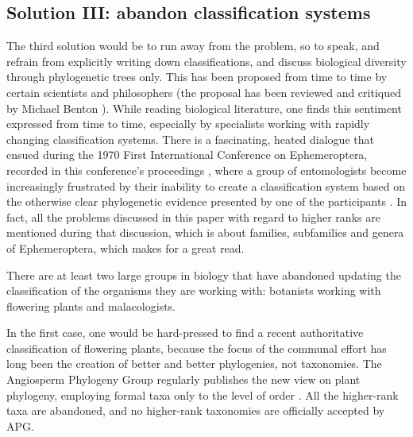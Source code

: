 \begin{artengenv}
\subsection{Solution III: abandon classification systems}

The third solution would be to run away from the problem, so to speak, and refrain from explicitly writing down
classifications, and discuss biological diversity through phylogenetic trees only. This has been proposed from time to
time by certain scientists and philosophers (the proposal has been reviewed and critiqued by Michael Benton
\parencite*{benton_stems_2000}).
While reading biological literature, one finds this sentiment expressed from time to
time, especially by specialists working with rapidly changing classification systems. There is a fascinating, heated
dialogue that ensued during the 1970 First International Conference on Ephemeroptera, recorded in this conference’s
proceedings
\parencite[pp.151–154]{peters_proceedings_1973},
where a group of entomologists become
increasingly frustrated by their inability to create a classification system based on the otherwise clear phylogenetic
evidence presented by one of the participants
\parencite{edmunds_jr_critical_1973}.
In fact, all the problems
discussed in this paper with regard to higher ranks are mentioned during that discussion, which is about families,
subfamilies and genera of Ephemeroptera, which makes for a great read.

There are at least two large groups in biology that have abandoned updating the classification of the organisms they are
working with: botanists working with flowering plants and malacologists.

In the first case, one would be hard-pressed to find a recent authoritative classification of flowering plants, because
the focus of the communal effort has long been the creation of better and better phylogenies, not taxonomies. The
Angiosperm Phylogeny Group regularly publishes the new view on plant phylogeny, employing formal taxa only to the level
of order
\parencite[see e.g.][]{chase_update_2016}.
All the higher-rank taxa are abandoned, and no
higher-rank taxonomies are officially accepted by APG.


\end{artengenv}
